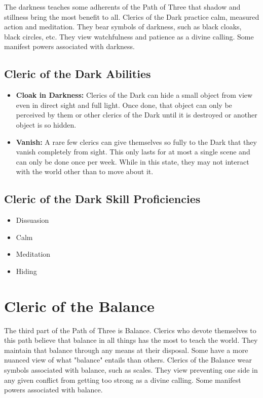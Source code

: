 \begin{multicols}{2}
The darkness teaches some adherents of the Path of Three that shadow and stillness
bring the most benefit to all. Clerics of the Dark practice calm, measured
action and meditation. They bear symbols of darkness, such as black cloaks,
black circles, etc. They view watchfulness and patience as a divine calling.
Some manifest powers associated with darkness.

\subsection{Cleric of the Dark Abilities}

\begin{itemize}
  \item \textbf{Cloak in Darkness:} Clerics of the Dark can hide a small object
    from view even in direct sight and full light. Once done, that object can only
    be perceived by them or other clerics of the Dark until it is destroyed or
    another object is so hidden.
  \item \textbf{Vanish:} A rare few clerics can give themselves so fully to the
    Dark that they vanish completely from sight. This only lasts for at most a single
    scene and can only be done once per week. While in this state, they may not
    interact with the world other than to move about it.
\end{itemize}

\subsection{Cleric of the Dark Skill Proficiencies}

\begin{itemize}
  \item Dissuasion
  \item Calm
  \item Meditation
  \item Hiding
\end{itemize}

\section{Cleric of the Balance}

The third part of the Path of Three is Balance. Clerics who devote themselves to
this path believe that balance in all things has the most to teach the world.
They maintain that balance through any means at their disposal. Some have a more
nuanced view of what "balance" entails than others. Clerics of the Balance wear
symbols associated with balance, such as scales. They view preventing one side
in any given conflict from getting too strong as a divine calling. Some manifest
powers associated with balance.


\end{multicols}
